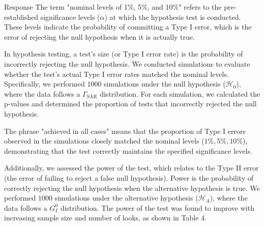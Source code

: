 \documentclass[11pt]{report}
\begin{document}
\begin{responsebox}{Response}
The term "nominal levels of 1\%, 5\%, and 10\%" refers to the  pre-established significance levels ($\alpha$) at which the hypothesis test is conducted. 
These levels indicate the probability of committing a Type I error, which is the error of rejecting the null hypothesis when it is actually true. 

In hypothesis testing, a test's size (or Type I error rate) is the probability of incorrectly rejecting the null hypothesis. 
We conducted simulations to evaluate whether the test's actual Type I error rates matched the nominal levels. Specifically, we performed $1000$ simulations under the null hypothesis ($\mathcal{H}_0$), where the data follows a $\Gamma_{\text{SAR}}$ distribution. For each simulation, we calculated the p-values and determined the proportion of tests that incorrectly rejected the null hypothesis. 

The phrase "achieved in all cases" means that the proportion of Type I errors observed in the simulations closely matched the nominal levels ($1\%, 5\%, 10\%$), demonstrating that the test correctly maintains the specified significance levels.

Additionally, we assessed the power of the test, which relates to the Type II error (the error of failing to reject a false null hypothesis). 
Power is the probability of correctly rejecting the null hypothesis when the alternative hypothesis is true. We performed $1000$ simulations under the alternative hypothesis ($\mathcal{H}_A$), where the data follows a $G_I^0$ distribution. The power of the test was found to improve with increasing sample size and number of looks, as shown in Table 4.



\end{responsebox}
\end{document}
